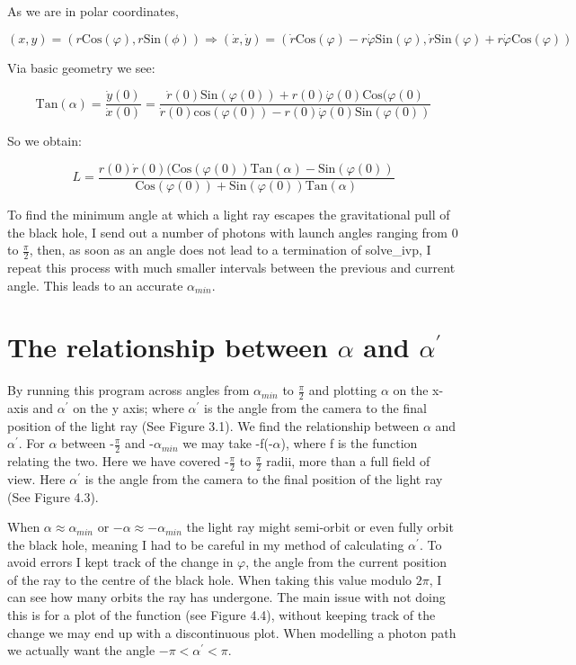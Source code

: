 \documentclass[oneside,openright,frontopenright, singlespacing]{dmathesis}
\begin{document}
\vspace{1em}
	As we are in polar coordinates, 

			\[(x, y) = (r\mbox{Cos}(\varphi), r\mbox{Sin}(\phi)) \Rightarrow (\dot{x}, \dot{y}) = (\dot{r}\mbox{Cos}(\varphi) - r\dot{\varphi}\mbox{Sin}(\varphi), \dot{r}\mbox{Sin}(\varphi) + r\dot{\varphi}\mbox{Cos}(\varphi))\]
	
\vspace{1em}
	Via basic geometry we see:
			
			\[\mbox{Tan}(\alpha) = \frac{\dot{y}(0)}{\dot{x}(0)} = \frac{\dot{r}(0)\mbox{Sin}(\varphi(0)) + r(0)\dot{\varphi}(0)\mbox{Cos}(\varphi(0)}{\dot{r}(0)\mbox{cos}(\varphi(0)) - r(0)\dot{\varphi}(0)\mbox{Sin}(\varphi(0))}\]

\vspace{1em}
	So we obtain:

			\[ L = \frac{r(0)\dot{r}(0)(\mbox{Cos}(\varphi(0))\mbox{Tan}(\alpha)-\mbox{Sin}(\varphi(0))}{\mbox{Cos}(\varphi(0))+\mbox{Sin}(\varphi(0))\mbox{Tan}(\alpha)}\]
	
\vspace{1em}
	To find the minimum angle at which a light ray escapes the gravitational pull of the black hole, I send out a number of photons with launch angles ranging from 0 to $\frac{\pi}{2}$, then, as soon as an angle does not lead to a termination of solve\_ivp, I repeat this process with much smaller intervals between the previous and current angle. This leads to an accurate $\alpha_{min}$.

\section{The relationship between $\alpha$ and $\alpha^{'}$}

	By running this program across angles from $\alpha_{min}$ to $\frac{\pi}{2}$ and plotting $\alpha$ on the x-axis and $\alpha^{'}$ on the y axis; where  $\alpha^{'}$ is the angle from the camera to the final position of the light ray (See Figure 3.1). We find the relationship between $\alpha$ and $\alpha^{'}$. For $\alpha$ between -$\frac{\pi}{2}$ and -$\alpha_{min}$ we may take -f(-$\alpha$), where f is the function relating the two. Here we have covered -$\frac{\pi}{2}$ to $\frac{\pi}{2}$ radii, more than a full field of view. Here $\alpha^{'}$ is the angle from the camera to the final position of the light ray (See Figure 4.3).

\vspace{1em}
	When $\alpha \approx \alpha_{min}$ or $-\alpha \approx -\alpha_{min}$ the light ray might semi-orbit or even fully orbit the black hole, meaning I had to be careful in my method  of calculating $\alpha^{'}$. To avoid errors I kept track of the change in $\varphi$, the angle from the current position of the ray to the centre of the black hole. When taking this value modulo $2\pi$, I can see how many orbits the ray has undergone. The main issue with not doing this is for a plot of the function (see Figure 4.4), without keeping track of the change we may end up with a discontinuous plot. When modelling a photon path we actually want the angle $-\pi<\alpha^{'}<\pi$.
\end{document}
